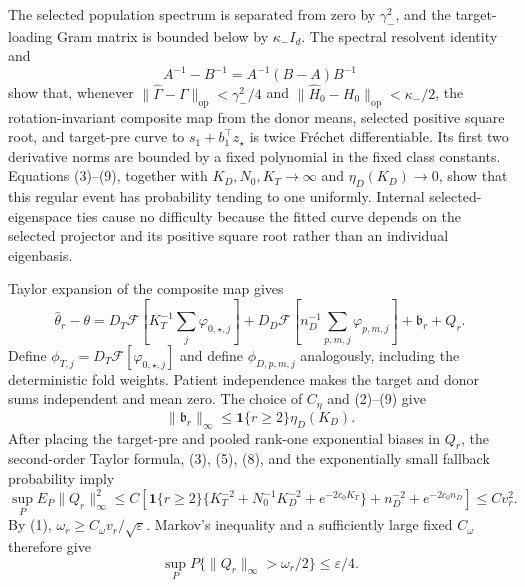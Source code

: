 The selected population spectrum is separated from zero by \(\gamma_-^2\), and the target-loading Gram matrix is bounded below by \(\kappa_-I_d\). The spectral resolvent identity and
\[
 A^{-1}-B^{-1}=A^{-1}(B-A)B^{-1} \tag{10}
\]
show that, whenever \(\|\widehat\Gamma-\Gamma\|_{\mathrm{op}}<\gamma_-^2/4\) and \(\|\widehat H_0-H_0\|_{\mathrm{op}}<\kappa_-/2\), the rotation-invariant composite map from the donor means, selected positive square root, and target-pre curve to \(s_1+b_1^\top z_\star\) is twice Fr\'echet differentiable. Its first two derivative norms are bounded by a fixed polynomial in the fixed class constants. Equations (3)--(9), together with \(K_D,N_0,K_T\to\infty\) and \(\eta_D(K_D)\to0\), show that this regular event has probability tending to one uniformly. Internal selected-eigenspace ties cause no difficulty because the fitted curve depends on the selected projector and its positive square root rather than an individual eigenbasis.

Taylor expansion of the composite map gives
\[
 \widehat\theta_r-\theta
 =D_T\mathcal F\!\left[K_T^{-1}\sum_j\varphi_{0,\star,j}\right]
 +D_D\mathcal F\!\left[n_D^{-1}\sum_{p,m,j}\varphi_{p,m,j}\right]
 +\mathfrak b_r+Q_r. \tag{11}
\]
Define \(\phi_{T,j}=D_T\mathcal F[\varphi_{0,\star,j}]\) and define \(\phi_{D,p,m,j}\) analogously, including the deterministic fold weights. Patient independence makes the target and donor sums independent and mean zero. The choice of \(C_\eta\) and (2)--(9) give
\[
 \|\mathfrak b_r\|_\infty\le\mathbf 1\{r\ge2\}\eta_D(K_D). \tag{12}
\]
After placing the target-pre and pooled rank-one exponential biases in \(Q_r\), the second-order Taylor formula, (3), (5), (8), and the exponentially small fallback probability imply
\[
 \sup_P E_P\|Q_r\|_\infty^2
 \le C\left[
 \mathbf 1\{r\ge2\}\{K_T^{-2}+N_0^{-1}K_D^{-2}+e^{-2c_0K_T}\}
 +n_D^{-2}+e^{-2c_0n_D}
 \right]
 \le Cv_r^2. \tag{13}
\]
By (1), \(\omega_r\ge C_\omega v_r/\sqrt\varepsilon\). Markov's inequality and a sufficiently large fixed \(C_\omega\) therefore give
\[
 \sup_P P\{\|Q_r\|_\infty>\omega_r/2\}\le\varepsilon/4. \tag{14}
\]

